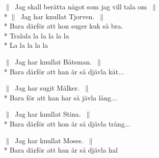 \begin{SongText}[Saltkråkan]
    \begin{SongVerse}
        $\|\:$ Jag skall berätta något som jag vill tala om $\:\|$\\*%
        $\|\:$ Jag har knullat Tjorven. $\:\|$\\*%
        Bara därför att hon suger kuk så bra.\\*%
        Tralala la la la la la\\*%
        La la la la la
    \end{SongVerse}
    \begin{SongVerse}
        $\|\:$ Jag har knullat Båtsman. $\:\|$\\*%
        Bara därför att han är så djävla kåt...
    \end{SongVerse}
    \begin{SongVerse}
        $\|\:$ Jag har sugit Mälker. $\:\|$\\*%
        Bara för att han har så jävla lång...
    \end{SongVerse}
    \begin{SongVerse}
        $\|\:$ Jag har knullat Stina. $\:\|$\\*%
        Bara därför att hon är så djävla trång...
    \end{SongVerse}
    \begin{SongVerse}
        $\|\:$ Jag har knullat Moses. $\:\|$\\*%
        Bara därför att han är så djävla hal
    \end{SongVerse}
\end{SongText}

